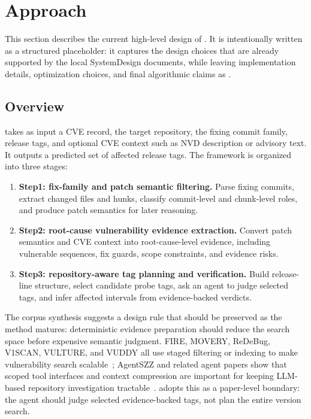\section{\toolname Approach}
\label{sec:approach}

This section describes the current high-level design of \toolname. It is intentionally written as a structured placeholder: it captures the design choices that are already supported by the local SystemDesign documents, while leaving implementation details, optimization choices, and final algorithmic claims as .

\subsection{Overview}

\toolname takes as input a CVE record, the target repository, the fixing commit family, release tags, and optional CVE context such as NVD description or advisory text. It outputs a predicted set of affected release tags. The framework is organized into three stages:
\begin{enumerate}[leftmargin=*]
  \item \textbf{Step1: fix-family and patch semantic filtering.} Parse fixing commits, extract changed files and hunks, classify commit-level and chunk-level roles, and produce patch semantics for later reasoning.
  \item \textbf{Step2: root-cause vulnerability evidence extraction.} Convert patch semantics and CVE context into root-cause-level evidence, including vulnerable sequences, fix guards, scope constraints, and evidence risks.
  \item \textbf{Step3: repository-aware tag planning and verification.} Build release-line structure, select candidate probe tags, ask an agent to judge selected tags, and infer affected intervals from evidence-backed verdicts.
\end{enumerate}

The corpus synthesis suggests a design rule that should be preserved as the method matures: deterministic evidence preparation should reduce the search space before expensive semantic judgment. FIRE, MOVERY, ReDeBug, V1SCAN, VULTURE, and VUDDY all use staged filtering or indexing to make vulnerability search scalable~\cite{fire2024,movery2022,redebug2012,v1scan2023,vulture2025,vuddy2017}; AgentSZZ and related agent papers show that scoped tool interfaces and context compression are important for keeping LLM-based repository investigation tractable~\cite{agentszz2026,howwhyagents2026}. \toolname adopts this as a paper-level boundary: the agent should judge selected evidence-backed tags, not plan the entire version search.

